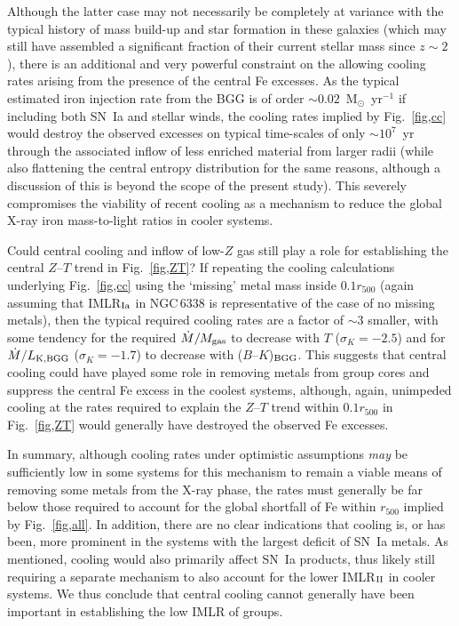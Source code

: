 \documentclass[useAMS,usenatbib]{mn2e}
\begin{document}
Although the latter case may not necessarily be completely at variance
with the typical history of mass build-up and star formation in these
galaxies (which may still have assembled a significant fraction of
their current stellar mass since $z \sim 2$), there is an additional
and very powerful constraint on the allowing cooling rates arising
from the presence of the central Fe excesses. As the typical estimated
iron injection rate from the BGG is of order $\sim
0.02$~M$_\odot$~yr$^{-1}$ if including both SN~Ia and stellar winds,
the cooling rates implied by Fig.~\ref{fig,cc} would destroy the
observed excesses on typical time-scales of only $\sim 10^7$~yr
through the associated inflow of less enriched material from larger
radii (while also flattening the central entropy distribution for the
same reasons, although a discussion of this is beyond the scope of the
present study). This severely compromises the viability of recent
cooling as a mechanism to reduce the global X-ray iron mass-to-light
ratios in cooler systems.

Could central cooling and inflow of low-$Z$ gas still play a role for
establishing the central $Z$--$T$ trend in Fig.~\ref{fig,ZT}? If
repeating the cooling calculations underlying Fig.~\ref{fig,cc} using
the `missing' metal mass inside $0.1 r_{500}$ (again assuming that
IMLR$_{\rm Ia}$ in NGC\,6338 is representative of the case of no
missing metals), then the typical required cooling rates are a factor
of $\sim 3$ smaller, with some tendency for the required $\dot M /
M_{\rm gas}$ to decrease with $T$ ($\sigma_K=-2.5$) and for $\dot
M/L_{\rm K,BGG}$ ($\sigma_K=-1.7$) to decrease with ($B$--$K$)$_{\rm
BGG}$. This suggests that central cooling could have played some role
in removing metals from group cores and suppress the central Fe excess
in the coolest systems, although, again, unimpeded cooling at the
rates required to explain the $Z$--$T$ trend within $0.1r_{500}$ in
Fig.~\ref{fig,ZT} would generally have destroyed the observed Fe
excesses.

In summary, although cooling rates under optimistic assumptions {\em
may} be sufficiently low in some systems for this mechanism to remain
a viable means of removing some metals from the X-ray phase, the rates
must generally be far below those required to account for the global
shortfall of Fe within $r_{500}$ implied by Fig.~\ref{fig,all}. In
addition, there are no clear indications that cooling is, or has been,
more prominent in the systems with the largest deficit of SN~Ia
metals.  As mentioned, cooling would also primarily affect SN~Ia
products, thus likely still requiring a separate mechanism to also
account for the lower IMLR$_{\rm II}$ in cooler systems. We thus
conclude that central cooling cannot generally have been important in
establishing the low IMLR of groups.
\end{document}
